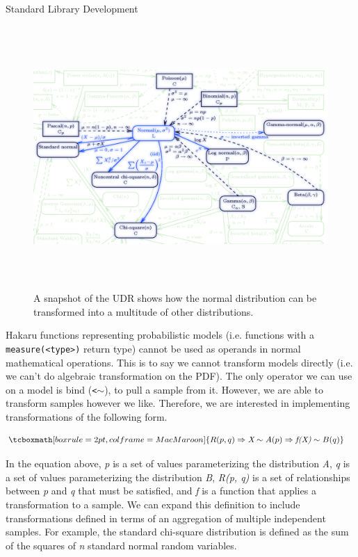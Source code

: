 \documentclass[22pt]{beamer}
\begin{document}
\begin{frame}[fragile]
\begin{textblock}{5}
\begin{textblock}{5}
\begin{block}{Standard Library Development}
\bigskip

\begin{figure}
\centering
\includegraphics[height=10cm]{UDR.png}
\caption{\tiny{A snapshot of the UDR shows how the normal distribution can be transformed into a multitude of other distributions.}}
\end{figure}

\tiny{Hakaru functions representing probabilistic models (i.e. functions with a {\tt \tiny{measure(<type>)}} return type) cannot be used as operands in normal mathematical operations. This is to say we cannot transform models directly (i.e. we can’t do algebraic transformation on the PDF). The only operator we can use on a model is bind ({\tt \tiny{<$\sim$}}), to pull a sample from it. However, we are able to transform samples however we like. Therefore, we are interested in implementing transformations of the following form.}

\begin{equation*}
\begin{aligned}
& \tcboxmath[boxrule=2pt,colframe=MacMaroon]{R(p, q) \Rightarrow \textit{X} \sim A(p) \Rightarrow \textit{f(X)} \sim B(q)}
\end{aligned}
\end{equation*}

\bigskip

\tiny{In the equation above, \textit{p} is a set of values parameterizing the distribution \textit{A}}, \textit{q} is a set of values parameterizing the distribution \textit{B}, \textit{R(p, q)} is a set of relationships between \textit{p} and \textit{q} that must be satisfied, and \textit{f} is a function that applies a transformation to a sample. We can expand this definition to include transformations defined in terms of an aggregation of multiple independent samples. For example, the standard chi-square distribution is defined as the sum of the squares of \textit{n} standard normal random variables. 


\end{block}
\end{textblock}
\end{textblock}
\end{frame}
\end{document}
